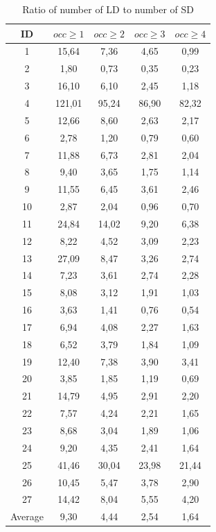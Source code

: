\documentclass[conference]{IEEEtran}
\begin{document}
\begin{table}[!h]
\renewcommand{\arraystretch}{1.25}
\caption{Ratio of number of LD to number of SD}
\label{table:ld_ratio}
\centering
\begin{tabular}{|c|c|c|c|c|}
\hline
    ID  & $occ\geq 1$ & $occ\geq 2$ & $occ\geq 3$ & $occ\geq 4$  \\
\hline
1	&	15,64	&	7,36	&	4,65	&	0,99	\\
2	&	1,80	&	0,73	&	0,35	&	0,23	\\
3	&	16,10	&	6,10	&	2,45	&	1,18	\\
4	&	121,01	&	95,24	&	86,90	&	82,32	\\
5	&	12,66	&	8,60	&	2,63	&	2,17	\\
6	&	2,78	&	1,20	&	0,79	&	0,60	\\
7	&	11,88	&	6,73	&	2,81	&	2,04	\\
8	&	9,40	&	3,65	&	1,75	&	1,14	\\
9	&	11,55	&	6,45	&	3,61	&	2,46	\\
10	&	2,87	&	2,04	&	0,96	&	0,70	\\
11	&	24,84	&	14,02	&	9,20	&	6,38	\\
12	&	8,22	&	4,52	&	3,09	&	2,23	\\
13	&	27,09	&	8,47	&	3,26	&	2,74	\\
14	&	7,23	&	3,61	&	2,74	&	2,28	\\
15	&	8,08	&	3,12	&	1,91	&	1,03	\\
16	&	3,63	&	1,41	&	0,76	&	0,54	\\
17	&	6,94	&	4,08	&	2,27	&	1,63	\\
18	&	6,52	&	3,79	&	1,84	&	1,09	\\
19	&	12,40	&	7,38	&	3,90	&	3,41	\\
20	&	3,85	&	1,85	&	1,19	&	0,69	\\
21	&	14,79	&	4,95	&	2,91	&	2,20	\\
22	&	7,57	&	4,24	&	2,21	&	1,65	\\
23	&	8,68	&	3,04	&	1,89	&	1,06	\\
24	&	9,20	&	4,35	&	2,41	&	1,64	\\
25	&	41,46	&	30,04	&	23,98	&	21,44	\\
26	&	10,45	&	5,47	&	3,78	&	2,90	\\
27	&	14,42	&	8,04	&	5,55	&	4,20	\\

\hline
Average	&	9,30	&	4,44	&	2,54	&	1,64	\\

\hline
\end{tabular}
\end{table}
\end{document}
